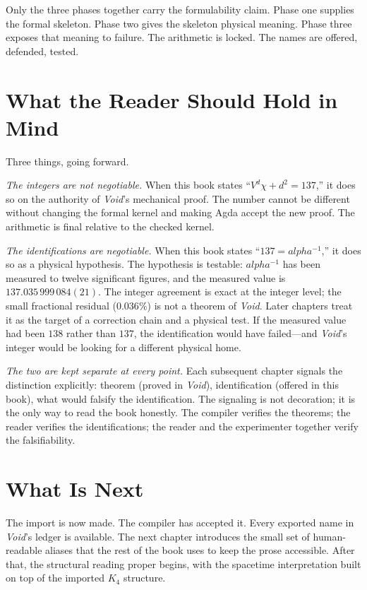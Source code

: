 \documentclass[11pt,a4paper]{book}
\def\alpha{alpha}%
\begin{document}
Only the three phases together carry the formulability claim. Phase one supplies the formal skeleton. Phase two gives the skeleton physical meaning. Phase three exposes that meaning to failure. The arithmetic is locked. The names are offered, defended, tested.

\section*{What the Reader Should Hold in Mind}

Three things, going forward.

\emph{The integers are not negotiable.} When this book states ``$V^d \chi + d^2 = 137$,'' it does so on the authority of \textit{Void}'s mechanical proof. The number cannot be different without changing the formal kernel and making Agda accept the new proof. The arithmetic is final relative to the checked kernel.

\emph{The identifications are negotiable.} When this book states ``$137 = \alpha^{-1}$,'' it does so as a physical hypothesis. The hypothesis is testable: $\alpha^{-1}$ has been measured to twelve significant figures, and the measured value is $137.035\,999\,084(21)$. The integer agreement is exact at the integer level; the small fractional residual ($0.036\%$) is not a theorem of \textit{Void}. Later chapters treat it as the target of a correction chain and a physical test. If the measured value had been $138$ rather than $137$, the identification would have failed---and \textit{Void}'s integer would be looking for a different physical home.

\emph{The two are kept separate at every point.} Each subsequent chapter signals the distinction explicitly: theorem (proved in \textit{Void}), identification (offered in this book), what would falsify the identification. The signaling is not decoration; it is the only way to read the book honestly. The compiler verifies the theorems; the reader verifies the identifications; the reader and the experimenter together verify the falsifiability.

\section*{What Is Next}

The import is now made. The compiler has accepted it. Every exported name in \textit{Void}'s ledger is available. The next chapter introduces the small set of human-readable aliases that the rest of the book uses to keep the prose accessible. After that, the structural reading proper begins, with the spacetime interpretation built on top of the imported $K_4$ structure.
\end{document}
